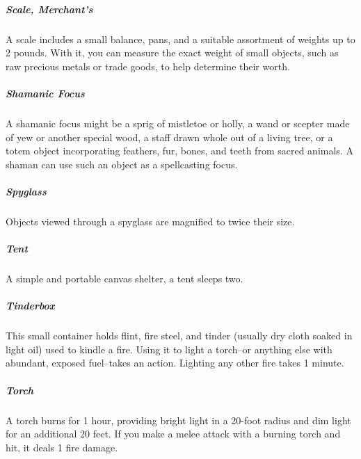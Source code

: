 \subparagraph*{Scale, Merchant's} A scale includes a small balance, pans, and a suitable assortment of weights up to 2 pounds. With it, you can measure the exact weight of small objects, such as raw precious metals or trade goods, to help determine their worth.

\subparagraph*{Shamanic Focus} A shamanic focus might be a sprig of mistletoe or holly, a wand or scepter made of yew or another special wood, a staff drawn whole out of a living tree, or a totem object incorporating feathers, fur, bones, and teeth from sacred animals. A shaman can use such an object as a spellcasting focus.

\subparagraph*{Spyglass} Objects viewed through a spyglass are magnified to twice their size.

\subparagraph*{Tent} A simple and portable canvas shelter, a tent sleeps two.

\subparagraph*{Tinderbox} This small container holds flint, fire steel, and tinder (usually dry cloth soaked in light oil) used to kindle a fire. Using it to light a torch--or anything else with abundant, exposed fuel--takes an action. Lighting any other fire takes 1 minute.

\subparagraph*{Torch} A torch burns for 1 hour, providing bright light in a 20-foot radius and dim light for an additional 20 feet. If you make a melee attack with a burning torch and hit, it deals 1 fire damage.

